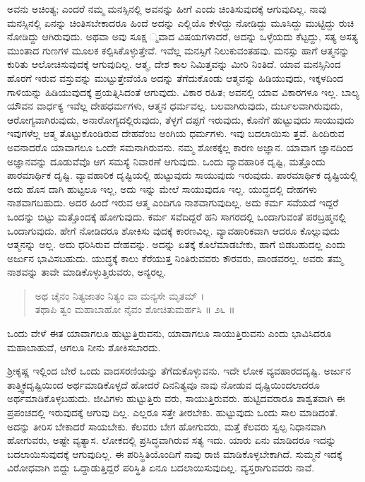 ಅವನು ಅಚಿಂತ್ಯ; ಎಂದರೆ ನಮ್ಮ ಮನಸ್ಸಿನಲ್ಲಿ ಅವನನ್ನು ಹೀಗೆ ಎಂದು ಚಿಂತಿಸುವುದಕ್ಕೆ ಆಗುವುದಿಲ್ಲ. ನಾವು ಮನಸ್ಸಿನಲ್ಲಿ ಏನನ್ನು ಚಿಂತಿಸಬೇಕಾದರೂ ಹಿಂದೆ ಅದನ್ನು ಎಲ್ಲಿಯೊ ಕೇಳಿದ್ದು ನೋಡಿದ್ದು ಮೂಸಿದ್ದು ಮುಟ್ಟಿದ್ದು ರುಚಿ ನೋಡಿದ್ದು ಆಗಿರುವುದು. ಅಥವಾ ಅವು ಸೂಕ್ಷ ್ಮವಾದ ವಿಷಯಗಳಾದರೆ, ಅದನ್ನು ಒಳ್ಳೆಯದು ಕೆಟ್ಟದ್ದು, ಸತ್ಯ ಅಸತ್ಯ ಮುಂತಾದ ಗುಣಗಳ ಮೂಲಕ ಕಲ್ಪಿಸಿಕೊಳ್ಳುತ್ತೇವೆ. ಇವೆಲ್ಲ ಮನಸ್ಸಿಗೆ ನಿಲುಕುವಂತಹವು. ಮನಸ್ಸು ಹಾಗೆ ಆತ್ಮನನ್ನು ಕುರಿತು ಆಲೋಚಿಸುವುದಕ್ಕೆ ಆಗುವುದಿಲ್ಲ. ಆತ್ಮ, ದೇಶ ಕಾಲ ನಿಮಿತ್ತವನ್ನು ಮೀರಿ ನಿಂತಿದೆ. ಯಾವ ಮನಸ್ಸಿನಿಂದ ಹೊರಗೆ ಇರುವ ವಸ್ತುವನ್ನು ಮುಟ್ಟುತ್ತೇವೆಯೊ ಅದನ್ನು ತೆಗೆದುಕೊಂಡು ಆತ್ಮವನ್ನು ಹಿಡಿಯುವುದು, ಇಕ್ಕಳದಿಂದ ಗಾಳಿಯನ್ನು ಹಿಡಿಯುವುದಕ್ಕೆ ಪ್ರಯತ್ನಿಸಿದಂತೆ ಆಗುವುದು. ವಿಕಾರ ರಹಿತ; ಅವನಲ್ಲಿ ಯಾವ ವಿಕಾರಗಳೂ ಇಲ್ಲ. ಬಾಲ್ಯ ಯೌವನ ವಾರ್ಧಕ್ಯ ಇವೆಲ್ಲ ದೇಹಧರ್ಮಗಳು, ಆತ್ಮನ ಧರ್ಮವಲ್ಲ. ಬಲವಾಗಿರುವುದು, ದುರ್ಬಲವಾಗಿರುವುದು, ಆರೋಗ್ಯವಾಗಿರುವುದು, ಅನಾರೋಗ್ಯದಲ್ಲಿರುವುದು, ತೆಳ್ಳಗೆ ದಪ್ಪಗೆ ಇರುವುದು, ಕೊನೆಗೆ ಹುಟ್ಟುವುದು ಸಾಯುವುದು ಇವುಗಳೆಲ್ಲ ಆತ್ಮ ತೊಟ್ಟುಕೊಂಡಿರುವ ದೇಹವೆಂಬ ಅಂಗಿಯ ಧರ್ಮಗಳು. ಇವು ಬದಲಾಯಿಸು ತ್ತವೆ. ಹಿಂದಿರುವ ಅವನಾದರೊ ಯಾವಾಗಲೂ ಒಂದೇ ಸಮನಾಗಿರುವನು. ನಮ್ಮ ಶೋಕಕ್ಕೆಲ್ಲ ಕಾರಣ ಅಜ್ಞಾನ. ಯಾವಾಗ ಜ್ಞಾನದಿಂದ ಅಜ್ಞಾನವನ್ನು ದೂಡುವೆವೊ ಆಗ ಸಮಸ್ಯೆ ನಿವಾರಣೆ ಆಗುವುದು. ಒಂದು ವ್ಯಾವಹಾರಿಕ ದೃಷ್ಟಿ, ಮತ್ತೊಂದು ಪಾರಮಾರ್ಥಿಕ ದೃಷ್ಟಿ. ವ್ಯಾವಹಾರಿಕ ದೃಷ್ಟಿಯಲ್ಲಿ ಹುಟ್ಟುವುದು ಸಾಯುವುದು ಇರುವುದು. ಪಾರಮಾರ್ಥಿಕ ದೃಷ್ಟಿಯಲ್ಲಿ ಅದು ಹೊಸ ದಾಗಿ ಹುಟ್ಟಲೂ ಇಲ್ಲ, ಅದು ಇನ್ನು ಮೇಲೆ ಸಾಯುವುದೂ ಇಲ್ಲ. ಯುದ್ಧದಲ್ಲಿ ದೇಹಗಳು ನಾಶವಾಗಬಹುದು. ಅದರ ಹಿಂದೆ ಇರುವ ಆತ್ಮ ಎಂದಿಗೂ ನಾಶವಾಗುವುದಿಲ್ಲ. ಅದು ಕರ್ಮ ಸವೆಯದೆ ಇದ್ದರೆ ಒಂದನ್ನು ಬಿಟ್ಟು ಮತ್ತೊಂದಕ್ಕೆ ಹೋಗುವುದು. ಕರ್ಮ ಸವೆದಿದ್ದರೆ ಹನಿ ಸಾಗರದಲ್ಲಿ ಒಂದಾಗುವಂತೆ ಪರಬ್ರಹ್ಮನಲ್ಲಿ ಒಂದಾಗುವುದು. ಹೇಗೆ ನೋಡಿದರೂ ಶೋಕಿಸು ವುದಕ್ಕೆ ಕಾರಣವಿಲ್ಲ. ವ್ಯಾವಹಾರಿಕವಾಗಿ ಆದರೂ ಕೊಲ್ಲುವುದು ಆತ್ಮನನ್ನು ಅಲ್ಲ. ಅದು ಧರಿಸಿರುವ ದೇಹವನ್ನು. ಅದನ್ನು ಏತಕ್ಕೆ ಕೊಲೆಮಾಡಬೇಕು, ಹಾಗೆ ಬಿಡಬಹುದಲ್ಲ ಎಂದು ಅರ್ಜುನ ಭಾವಿಸಬಹುದು. ಯುದ್ಧಕ್ಕೆ ಕಾಲು ಕೆರೆಯುತ್ತ ನಿಂತಿರುವವರು ಕೌರವರು, ಪಾಂಡವರಲ್ಲ. ಅವರು ತಮ್ಮ ನಾಶವನ್ನು ತಾವೇ ಮಾಡಿಕೊಳ್ಳುತ್ತಿರುವರು, ಅನ್ಯರಲ್ಲ.

\begin{verse}
ಅಥ ಚೈನಂ ನಿತ್ಯಜಾತಂ ನಿತ್ಯಂ ವಾ ಮನ್ಯಸೇ ಮೃತಮ್ ।\\ತಥಾಪಿ ತ್ವಂ ಮಹಾಬಾಹೋ ನೈವಂ ಶೋಚಿತುಮರ್ಹಸಿ \num{॥ ೨೬ ॥}
\end{verse}

{\small ಒಂದು ವೇಳೆ ಈತ ಯಾವಾಗಲೂ ಹುಟ್ಟುತ್ತಿರುವನು, ಯಾವಾಗಲೂ ಸಾಯುತ್ತಿರುವನು ಎಂದು ಭಾವಿಸಿದರೂ ಮಹಾಬಾಹುವೆ, ಆಗಲೂ ನೀನು ಶೋಕಿಸಬಾರದು.}

ಶ್ರೀಕೃಷ್ಣ ಇಲ್ಲಿಂದ ಬೇರೆ ಒಂದು ವಾದಸರಣಿಯನ್ನು ತೆಗೆದುಕೊಳ್ಳುವನು. ಇದೇ ಲೋಕ ವ್ಯವಹಾರದದೃಷ್ಟಿ. ಅರ್ಜುನ ತಾತ್ತ್ವಿಕದೃಷ್ಟಿಯಿಂದ ಅರ್ಥಮಾಡಿಕೊಳ್ಳದೆ ಹೋದರೆ ದಿನನಿತ್ಯವೂ ನಾವು ನೋಡುವ ದೃಷ್ಟಿಯಿಂದಲಾದರೂ ಅರ್ಥಮಾಡಿಕೊಳ್ಳಬಹುದು. ಜೀವಿಗಳು ಹುಟ್ಟುತ್ತಿರು ವರು, ಸಾಯುತ್ತಿರುವರು. ಹುಟ್ಟಿದವರಾರೂ ಶಾಶ್ವತವಾಗಿ ಈ ಪ್ರಪಂಚದಲ್ಲಿ ಇರುವುದಕ್ಕೆ ಆಗುವು ದಿಲ್ಲ. ಎಲ್ಲರೂ ಸತ್ತೇ ತೀರಬೇಕು. ಹುಟ್ಟುವುದು ಒಂದು ಸಾಲ ಮಾಡಿದಂತೆ. ಅದನ್ನು ತೀರಿಸ ಬೇಕಾದರೆ ಸಾಯಬೇಕು. ಕೆಲವರು ಬೇಗ ಹೋಗುವರು, ಮತ್ತೆ ಕೆಲವರು ಸ್ವಲ್ಪ ನಿಧಾನವಾಗಿ ಹೋಗುವರು, ಅಷ್ಟೇ ವ್ಯತ್ಯಾಸ. ಲೋಕದಲ್ಲಿ ಪ್ರಸಿದ್ಧವಾಗಿರುವ ಸತ್ಯ ಇದು. ಯಾರು ಏನು ಮಾಡಿದರೂ ಇದನ್ನು ಬದಲಾಯಿಸುವುದಕ್ಕೆ ಆಗುವುದಿಲ್ಲ. ಈ ಪರಿಸ್ಥಿತಿಯೊಂದಿಗೆ ನಾವು ರಾಜಿ ಮಾಡಿಕೊಳ್ಳಬೇಕಾಗಿದೆ. ಸುಮ್ಮನೆ ಇದಕ್ಕೆ ವಿರೋಧವಾಗಿ ಬಿದ್ದು ಒದ್ದಾಡುತ್ತಿದ್ದರೆ ಪರಿಸ್ಥಿತಿ ಏನೂ ಬದಲಾಯಿಸುವುದಿಲ್ಲ. ವ್ಯಸ್ತರಾಗುವವರು ನಾವೆ.

